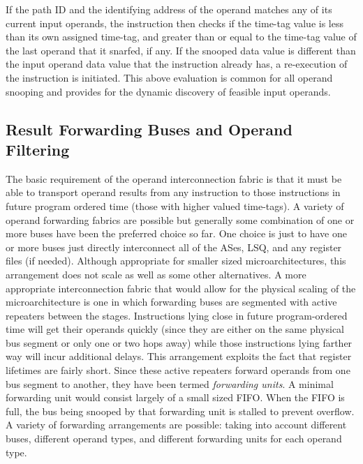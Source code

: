 \documentclass{book}
\begin{document}
If the
path ID and the identifying address of the operand matches any of
its current input operands, the instruction then checks
if the time-tag value is less than its own assigned time-tag,
and greater than or equal to the time-tag value of the last
operand that it snarfed, if any.  
If the snooped data value is
different than the input operand data value that the instruction 
already has, a re-execution of the instruction is initiated.
This above evaluation is common for all operand snooping
and provides for the dynamic discovery of
feasible input operands.
%
%
\subsection{Result Forwarding Buses and Operand Filtering}
%
The basic requirement of the operand interconnection 
fabric is that it must be able
to transport operand results from any instruction to those
instructions in future program ordered time (those with higher
valued time-tags).
A variety of operand forwarding fabrics are possible but
generally some combination of one or more buses have been the
preferred choice so far.
One choice is just to have one or more buses just directly
interconnect all of the ASes, LSQ, and any register files (if needed).
Although appropriate for smaller sized microarchitectures,
this arrangement does not scale as well as some other alternatives.
A more appropriate interconnection fabric that would allow
for the physical scaling of the microarchitecture is one in which
forwarding buses are segmented with active repeaters between
the stages.
Instructions lying close
in future program-ordered time will get their operands quickly
(since they are either on the same physical bus segment or only
one or two hops away)
while those instructions lying farther way 
will incur additional delays.
This arrangement exploits the fact that register lifetimes
are fairly short. \cite{Franklin92,Sohi95}
Since these active repeaters forward operands from
one bus segment to another, they have been termed \textit{forwarding
units}.
A minimal forwarding unit would consist largely of a small sized
FIFO.  When the FIFO is full, the bus being snooped by that
forwarding unit is stalled to prevent overflow.
A variety of forwarding arrangements are possible: taking
into account different buses, different operand types,
and different forwarding units for each operand type.
\end{document}
